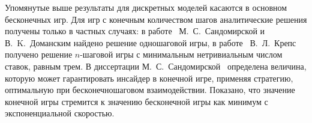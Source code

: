 Упомянутые выше результаты для дискретных моделей касаются в основном бесконечных игр.
Для игр с конечным количеством шагов аналитические решения получены только в частных случаях: в работе~\cite{sandomirskaya12} М.~С.~Сандомирской и В.~K.~Доманским найдено решение одношаговой игры, в работе~\cite{kreps09} В.~Л.~Крепс получено решение $n$-шаговой игры с минимальным нетривиальным числом ставок, равным трем.
В диссертации М.~С.~Сандомирской~\cite{phd:sandomirskaya} определена величина, которую может гарантировать инсайдер в конечной игре, применяя стратегию, оптимальную при бесконечношаговом взаимодействии.
Показано, что значение конечной игры стремится к значению бесконечной игры как минимум с экспоненциальной скоростью.


